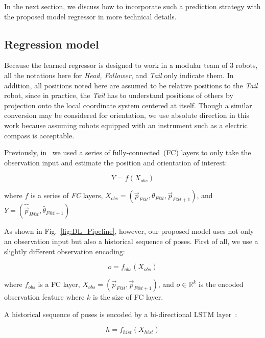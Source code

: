 \documentclass[letterpaper, 10 pt, conference]{ieeeconf}  %
\begin{document}
	In the next section, we discuss how to incorporate such a prediction strategy with
	the proposed model regressor in more technical details.


	\subsection{Regression model}
	\label{sec:regression_model}

	Because the learned regressor is designed to work in a modular team of $3$ robots,
	all the notations here for \emph{Head, Follower}, and \emph{Tail} only indicate
	them. In addition, all positions noted here are assumed to be relative positions
	to the \emph{Tail} robot, since in practice, the \emph{Tail} has to understand
	positions of others by projection onto the local coordinate system centered
	at itself. Though a similar conversion may be considered for orientation,
	we use absolute direction in this work because assuming robots equipped
	with an instrument such as a electric compass is acceptable.

	Previously, in~\cite{CPR17} we used a series of fully-connected~(FC) layers
	to only take the observation input and estimate the position and orientation
	of interest:

	\begin{equation}
	Y = f(X_{obs})
	\end{equation}

	\begin{flushleft}
	where $f$ is a series of \emph{FC} layers,
	$X_{obs} = (\vec{p}_{F@t}, \theta_{F@t}, \vec{p}_{F@t+1})$, and
	$Y = (\hat{\vec{p}}_{H@t}, \hat{\theta}_{F@t+1})$
	\end{flushleft}

	As shown in Fig.~\ref{fig:DL_Pipeline}, however, our proposed model uses not only
	an observation input but also a historical sequence of poses. First of all, we
	use a slightly different observation encoding:

	\begin{equation}
	o = f_{obs}(X_{obs})
	\end{equation}

	where $f_{obs}$ is a FC layer,
		$X_{obs} = (\vec{p}_{F@t}, \vec{p}_{F@t+1})$,
		and $o \in \mathbb{R}^{k}$ is the encoded observation feature
		where $k$ is the size of FC layer.

	A historical sequence of poses is encoded by a bi-directional LSTM layer~\cite{Wu16}:

	\begin{equation}
	h = f_{hist}(X_{hist})
	\end{equation}
\end{document}
